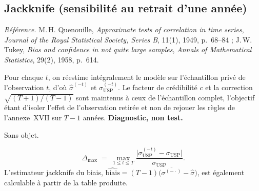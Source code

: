 \documentclass[a4paper,11pt]{article}
\newcommand{\refl}[1]{{\small\textcolor{maincolor!70!black}{\textit{Référence.} #1}}\par\smallskip}
\newcounter{ficheid}
\newenvironment{fiche}[1]{%
  \stepcounter{ficheid}%
  \phantomsection
  \subsection{#1}%
  \label{fiche:\theficheid}%
}{%
  \end{description}\vspace{0.5em}%
}
\newcommand{\Cadre}{%
  \begin{description}[leftmargin=0pt, style=unboxed, itemsep=3pt, topsep=3pt, parsep=2pt]%
  \item[\textcolor{financeblue}{\textbf{1. Cadre, notations et hypothèses de validité (non testées).}}]}
\newcommand{\Hzero}{\item[\textcolor{financeblue}{\textbf{2. Hypothèse nulle.}}]}
\newcommand{\Stat}{\item[\textcolor{financeblue}{\textbf{3. Statistique de test.}}]}
\begin{document}
\begin{fiche}{Jackknife (sensibilité au retrait d'une année)}
\label{fiche:jackknife}%
\refl{M.\,H. Quenouille, \emph{Approximate tests of correlation in time series}, \emph{Journal of
the Royal Statistical Society, Series B}, 11(1), 1949, p.~68--84 ; J.\,W. Tukey, \emph{Bias and
confidence in not quite large samples}, \emph{Annals of Mathematical Statistics}, 29(2), 1958,
p.~614.}
\Cadre
Pour chaque $t$, on réestime intégralement le modèle sur l'échantillon privé de l'observation $t$,
d'où $\hat\sigma^{(-t)}$ et $\sigma_{\mathrm{USP}}^{(-t)}$. Le facteur de crédibilité $c$ et la
correction $\sqrt{(T+1)/(T-1)}$ sont maintenus à ceux de l'échantillon complet, l'objectif étant
d'isoler l'effet de l'observation retirée et non de rejouer les règles de l'annexe~XVII sur $T-1$
années. \textbf{Diagnostic, non test.}
\Hzero
Sans objet.
\Stat
\[
  \Delta_{\max} \;=\; \max_{1\le t\le T}
  \frac{\big|\sigma_{\mathrm{USP}}^{(-t)} - \sigma_{\mathrm{USP}}\big|}{\sigma_{\mathrm{USP}}} .
\]
L'estimateur jackknife du biais,
$\widehat{\mathrm{biais}} = (T-1)\big(\overline{\sigma^{(-\cdot)}} - \hat\sigma\big)$, est
également calculable à partir de la table produite.


\end{fiche}
\end{document}
